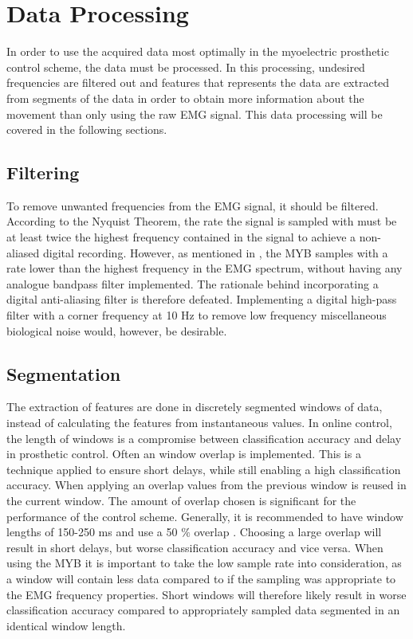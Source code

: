 \section{Data Processing} \label{sec:BG:dataProcessing}
In order to use the acquired data most optimally in the myoelectric prosthetic control scheme, the data must be processed. In this processing, undesired frequencies are filtered out and features that represents the data are extracted from segments of the data in order to obtain more information about the movement than only using the raw EMG signal. This data processing will be covered in the following sections. 

\subsection{Filtering}
To remove unwanted frequencies from the EMG signal, it should be filtered. According to the Nyquist Theorem, the rate the signal is sampled with must be at least twice the highest frequency contained in the signal to achieve a non-aliased digital recording. However, as mentioned in , the MYB samples with a rate lower than the highest frequency in the EMG spectrum, without having any analogue bandpass filter implemented. The rationale behind incorporating a digital anti-aliasing filter is therefore defeated. Implementing a digital high-pass filter with a corner frequency at 10 Hz to remove low frequency miscellaneous biological noise would, however, be desirable. \cite{Cram2012} 

\subsection{Segmentation}
The extraction of features are done in discretely segmented windows of data, instead of calculating the features from instantaneous values. In online control, the length of windows is a compromise between classification accuracy and delay in prosthetic control. Often an window overlap is implemented. This is a technique applied to ensure short delays, while still enabling a high classification accuracy. When applying an overlap values from the previous window is reused in the current window. The amount of overlap chosen is significant for the performance of the control scheme.  Generally, it is recommended to have window lengths of 150-250 ms and use a 50 $\percent$ overlap \cite{Menon2017}. Choosing a large overlap will result in short delays, but worse classification accuracy and vice versa. When using the MYB it is important to take the low sample rate into consideration, as a window will contain less data compared to if the sampling was appropriate to the EMG frequency properties. \cite{Menon2017} Short windows will therefore likely result in worse classification accuracy compared to appropriately sampled data segmented in an identical window length.


